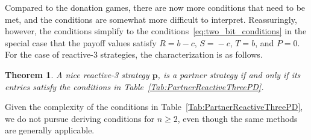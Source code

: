 \documentclass[11pt]{article}
\theoremstyle{plainCl1}
\newtheorem{theorem}{Theorem}
\theoremstyle{plainCl2}
\begin{document}
\noindent
Compared to the donation games, there are now more conditions that need to be met, and the conditions are somewhat more difficult to interpret. Reassuringly, however, the conditions simplify to the conditions~\eqref{eq:two_bit_conditions} in the special case that the payoff values satisfy $R\!=\!b\!-\!c$, $S\!=\!-c$, $T\!=\!b$, and $P\!=\!0$. 
For the case of reactive-3 strategies, the characterization is as follows. 



\begin{theorem}\label{theorem:reactive_three_partner_strategies_PD}
A nice reactive-3 strategy $\mathbf{p}$, is a partner strategy if and only if its entries satisfy the conditions in Table~\ref{Tab:PartnerReactiveThreePD}. 
\end{theorem}

\noindent
Given the complexity of the conditions in Table~\ref{Tab:PartnerReactiveThreePD}, we do not pursue deriving conditions for $n\!\ge\!2$, even though the same methods are generally applicable. 
\end{document}
